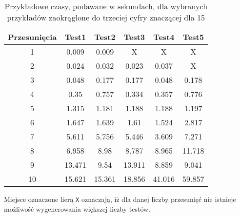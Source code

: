     \begin{table}[H]
        \centering
         \begin{tabular}{||c | c | c | c | c | c |} 
         \hline
         Przesunięcia & Test1 & Test2 & Test3 & Test4 & Test5 \\ [0.5ex] 
         \hline\hline
         1 & 0.009 & 0.009 & X & X & X \\ 
         \hline
         2 & 0.024 & 0.032 & 0.023 & 0.037 & X \\
         \hline
         3 &  0.048 & 0.177 & 0.177 & 0.048 & 0.178\\
         \hline
         4 &  0.35 & 0.757 & 0.334 & 0.357 & 0.776\\
         \hline
         5 &  1.315 & 1.181 & 1.188 & 1.188 & 1.197 \\
         \hline
         6 & 1.647 & 1.639 & 1.61 & 1.524 & 2.817\\ 
         \hline
         7 &  5.611 & 5.756 & 5.446 & 3.609 & 7.271\\
         \hline
         8 &  6.958 & 8.98 & 8.787 & 8.965 & 11.718 \\
         \hline
         9 &  13.471 & 9.54 & 13.911 & 8.859 & 9.041 \\
         \hline
         10 & 15.621 & 15.361 & 18.856 & 41.016 & 59.857 \\ [1ex]
         \hline
         \end{tabular}
         \caption{Przykładowe czasy, podawane w sekundach, dla wybranych przykładów zaokrąglone do trzeciej cyfry znaczącej dla 15}
    \end{table}
    Miejsce oznaczone lierą \texttt{X} oznaczają, iż dla danej liczby przesunięć nie istnieje możliwość wygenerowania większej liczby testów.
